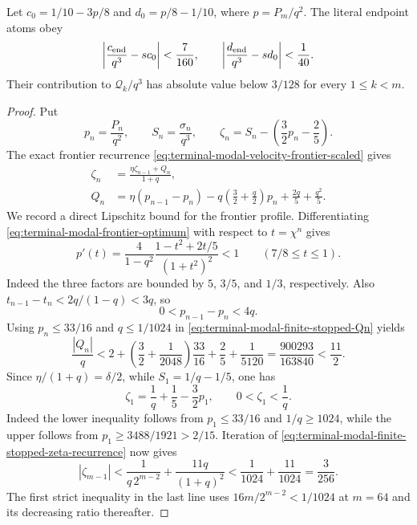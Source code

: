 \begin{lemma}
\label{lem:terminal-modal-finite-stopped-endpoint-perturbation}
Let $c_0=1/10-3p/8$ and $d_0=p/8-1/10$, where $p=P_m/q^2$.
The literal endpoint atoms obey
\begin{equation}
 \left|\frac{c_{\rm end}}{q^3}-sc_0\right|<\frac7{160},\qquad
 \left|\frac{d_{\rm end}}{q^3}-sd_0\right|<\frac1{40}.
 \label{eq:terminal-modal-finite-stopped-endpoint-errors}
\end{equation}
Their contribution to $\mathcal Q_k/q^3$ has absolute value below $3/128$
for every $1\le k<m$.
\end{lemma}

\begin{proof}
Put
\begin{equation}
 p_n=\frac{P_n}{q^2},\qquad S_n=\frac{\sigma_n}{q^3},\qquad
 \zeta_n=S_n-\left(\frac32p_n-\frac25\right).
\end{equation}
The exact frontier recurrence
\eqref{eq:terminal-modal-velocity-frontier-scaled} gives
\begin{align}
 \zeta_n&=\frac{\eta\zeta_{n-1}+Q_n}{1+q},
 \label{eq:terminal-modal-finite-stopped-zeta-recurrence}\\
 Q_n&=\eta(p_{n-1}-p_n)
 -q\left(\frac32+\frac q2\right)p_n+\frac{2q}{5}+\frac{q^2}{5}.
 \label{eq:terminal-modal-finite-stopped-Qn}
\end{align}
We record a direct Lipschitz bound for the frontier profile.  Differentiating
\eqref{eq:terminal-modal-frontier-optimum} with respect to
$t=\chi^n$ gives
\begin{equation}
 p'(t)=\frac4{1-q^2}
 \frac{1-t^2+2t/5}{(1+t^2)^2}<1
 \qquad(7/8\le t\le1).
\end{equation}
Indeed the three factors are bounded by $5$, $3/5$, and $1/3$,
respectively.  Also
$t_{n-1}-t_n<2q/(1-q)<3q$, so
\begin{equation}
 0<p_{n-1}-p_n<4q.
 \label{eq:terminal-modal-finite-stopped-p-difference}
\end{equation}
Using $p_n\le33/16$ and $q\le1/1024$ in
\eqref{eq:terminal-modal-finite-stopped-Qn} yields
\begin{equation}
 \frac{|Q_n|}{q}
 <2+\left(\frac32+\frac1{2048}\right)\frac{33}{16}
   +\frac25+\frac1{5120}
 =\frac{900293}{163840}<\frac{11}{2}.
 \label{eq:terminal-modal-finite-stopped-Qn-bound}
\end{equation}
Since $\eta/(1+q)=\delta/2$, while
$S_1=1/q-1/5$, one has
\begin{equation}
 \zeta_1=\frac1q+\frac15-\frac32p_1,\qquad0<\zeta_1<\frac1q.
\end{equation}
Indeed the lower inequality follows from
$p_1\le33/16$ and $1/q\ge1024$, while the upper follows from
$p_1\ge3488/1921>2/15$.  Iteration of
\eqref{eq:terminal-modal-finite-stopped-zeta-recurrence} now gives
\begin{equation}
 |\zeta_{m-1}|
 <\frac{1}{q\,2^{m-2}}+\frac{11q}{(1+q)^2}
 <\frac1{1024}+\frac{11}{1024}=\frac3{256}.
 \label{eq:terminal-modal-finite-stopped-zeta-bound}
\end{equation}
The first strict inequality in the last line uses
$16m/2^{m-2}<1/1024$ at $m=64$ and its decreasing ratio thereafter.


\end{proof}
